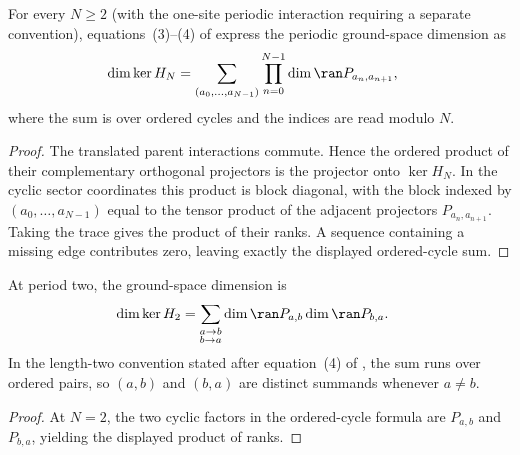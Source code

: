 \begin{lemma}
    \label{thm:beigi_ordered_cycle_ground_space_dimension}
    \leanok
    For every $N\geq2$ (with the one-site periodic interaction requiring a
    separate convention), equations~(3)--(4) of
    \cite[Section~III]{Beigi2012Classification} express the periodic
    ground-space dimension as
    \begin{align}
        \dim\ker H_N
         & =
        \sum_{(a_0,\ldots,a_{N-1})}
        \prod_{n=0}^{N-1}
        \dim\ran P_{a_n,a_{n+1}},
        \notag
    \end{align}
    where the sum is over ordered cycles and the indices are read modulo $N$.
\end{lemma}

\begin{proof}\leanok
    The translated parent interactions commute. Hence the ordered product of
    their complementary orthogonal projectors is the projector onto
    $\ker H_N$. In the cyclic sector coordinates this product is block
    diagonal, with the block indexed by $(a_0,\ldots,a_{N-1})$ equal to the
    tensor product of the adjacent projectors $P_{a_n,a_{n+1}}$. Taking the
    trace gives the product of their ranks. A sequence containing a missing
    edge contributes zero, leaving exactly the displayed ordered-cycle sum.
\end{proof}

\begin{lemma}
    \label{thm:beigi_ordered_cycle_ground_space_dimension_two}
    \leanok
    At period two, the ground-space dimension is
    \begin{align}
        \dim\ker H_2
         & =
        \sum_{\substack{a\to b \\ b\to a}}
        \dim\ran P_{a,b}
        \dim\ran P_{b,a}.
        \notag
    \end{align}
    In the length-two convention stated after equation~(4) of
    \cite[Section~III]{Beigi2012Classification}, the sum runs over ordered
    pairs, so $(a,b)$ and $(b,a)$ are distinct summands whenever $a\ne b$.
\end{lemma}

\begin{proof}\leanok
    At $N=2$, the two cyclic factors in the ordered-cycle formula are
    $P_{a,b}$ and $P_{b,a}$, yielding the displayed product of ranks.
\end{proof}
